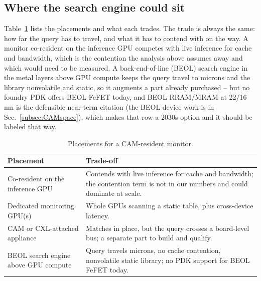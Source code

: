 \documentclass[conference]{IEEEtran}
\newcommand{\cam}{{CAM}\xspace}
\newcommand{\fefet}{{FeFET}\xspace}
\begin{document}
\subsection{Where the search engine could sit}
\label{subsec:Placement}
Table~\ref{tab:placement} lists the placements and what each trades. The
trade is always the same: how far the query has to travel, and what it
has to contend with on the way. A monitor co-resident on the inference
GPU competes with live inference for cache and bandwidth, which is the
contention the analysis above assumes away and which would need to be
measured. A back-end-of-line (BEOL) search engine in the metal layers
above GPU compute keeps the query travel to microns and the library
nonvolatile and static, so it augments a part already purchased -- but no
foundry PDK offers BEOL \fefet today, and BEOL RRAM/MRAM at 22/16\,nm is
the defensible near-term citation
(the BEOL device work is in Sec.~\ref{subsec:CAMspace}), which makes
that row a 2030s option and it should be labeled that way.

\begin{table}[t]
\centering
\caption{Placements for a \cam-resident monitor.}
\label{tab:placement}
{\footnotesize
\begin{tabular}{@{}p{}p{}@{}}
\toprule
\textbf{Placement} & \textbf{Trade-off} \\
\midrule
Co-resident on the inference GPU &
Contends with live inference for cache and bandwidth; the contention
term is not in our numbers and could dominate at scale. \\
Dedicated monitoring GPU(s) &
Whole GPUs scanning a static table, plus cross-device latency. \\
\cam or CXL-attached appliance &
Matches in place, but the query crosses a board-level bus; a separate
part to build and qualify. \\
BEOL search engine above GPU compute &
Query travels microns, no cache contention, nonvolatile static library;
no PDK support for BEOL \fefet today. \\
\bottomrule
\end{tabular}}
\end{table}
\end{document}
